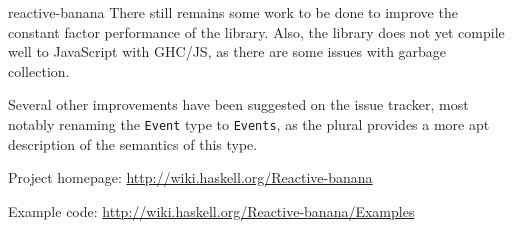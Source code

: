 \begin{hcarentry}[updated]{reactive-banana}
There still remains some work to be done to improve the constant factor performance of the library. Also, the library does not yet compile well to JavaScript with GHC/JS, as there are some issues with garbage collection.

Several other improvements have been suggested on the issue tracker, most notably renaming the \verb`Event` type to \verb`Events`, as the plural provides a more apt description of the semantics of this type.

\FurtherReading
\begin{compactitem}
\item Project homepage: \url{http://wiki.haskell.org/Reactive-banana}
\item Example code: \url{http://wiki.haskell.org/Reactive-banana/Examples}
\end{compactitem}
\end{hcarentry}
